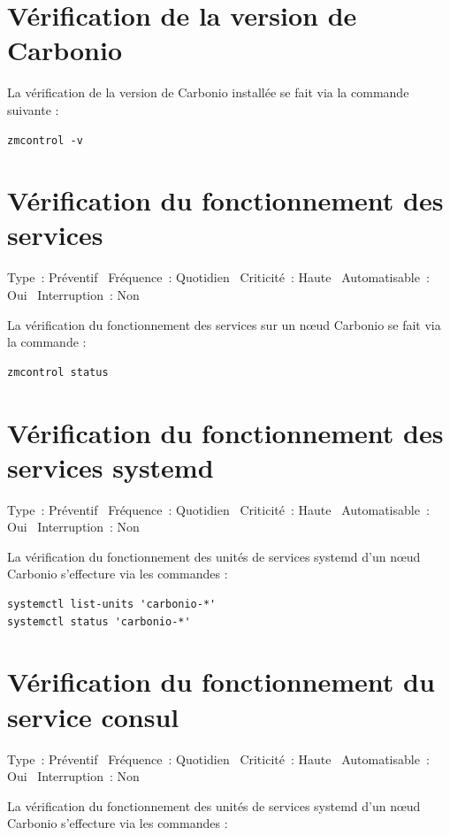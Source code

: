 \documentclass[11pt,a4paper]{report}
\begin{document}
\section{Vérification de la version de Carbonio}
La vérification de la version de Carbonio installée se fait via la commande suivante :

\begin{lstlisting}
zmcontrol -v
\end{lstlisting}


\section{Vérification du fonctionnement des services}
{\small\color{graytxt}%
Type~: Préventif \textbullet\ Fréquence~: Quotidien \textbullet\ Criticité~: Haute \textbullet\ Automatisable~: Oui \textbullet\ Interruption~: Non\par\vspace{4pt}}
La vérification du fonctionnement des services sur un nœud Carbonio se fait via la commande :

\begin{lstlisting}
zmcontrol status
\end{lstlisting}


\section{Vérification du fonctionnement des services systemd}
{\small\color{graytxt}%
Type~: Préventif \textbullet\ Fréquence~: Quotidien \textbullet\ Criticité~: Haute \textbullet\ Automatisable~: Oui \textbullet\ Interruption~: Non\par\vspace{4pt}}
La vérification du fonctionnement des unités de services systemd d'un nœud Carbonio s'effecture via les commandes :

\begin{lstlisting}
systemctl list-units 'carbonio-*'
systemctl status 'carbonio-*'
\end{lstlisting}


\section{Vérification du fonctionnement du service consul}
{\small\color{graytxt}%
Type~: Préventif \textbullet\ Fréquence~: Quotidien \textbullet\ Criticité~: Haute \textbullet\ Automatisable~: Oui \textbullet\ Interruption~: Non\par\vspace{4pt}}
La vérification du fonctionnement des unités de services systemd d'un nœud Carbonio s'effecture via les commandes :
\end{document}
